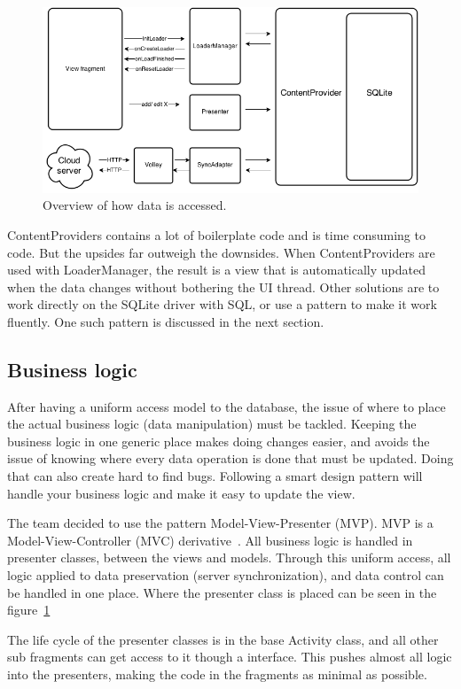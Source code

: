 \begin{figure}[H]
\includegraphics[width=\textwidth]{ch/architecture/fig/arch_app_overview.png}
\caption{Overview of how data is accessed.}
\label{fig:archAppOverview}
\end{figure}

ContentProviders contains a lot of boilerplate code and is time consuming to code. But the upsides far outweigh the downsides. When ContentProviders are used with LoaderManager, the result is a view that is automatically updated when the data changes without bothering the UI thread. Other solutions are to work directly on the SQLite driver with SQL, or use a pattern to make it work fluently. One such pattern is discussed in the next section. 

\subsection{Business logic}
After having a uniform access model to the database, the issue of where to place the actual business logic (data manipulation) must be tackled. Keeping the business logic in one generic place makes doing changes easier, and avoids the issue of knowing where every data operation is done that must be updated. Doing that can also create hard to find bugs. Following a smart design pattern will handle your business logic and make it easy to update the view. 

The team decided to use the pattern Model-View-Presenter (MVP). MVP is a Model-View-Controller (MVC) derivative~\cite{mvc}. All business logic is handled in presenter classes, between the views and models. Through this uniform access, all logic applied to data preservation (server synchronization), and data control can be handled in one place. Where the presenter class is placed can be seen in the figure~\ref{fig:archAppOverview}

The life cycle of the presenter classes is in the base Activity class, and all other sub fragments can get access to it though a interface. 
This pushes almost all logic into the presenters, making the code in the fragments as minimal as possible. 

